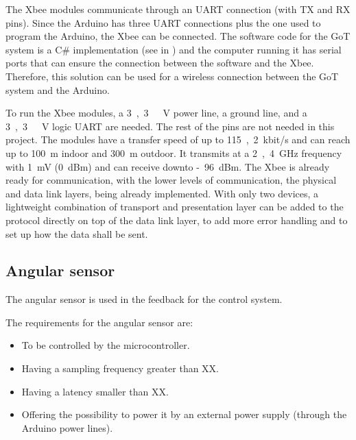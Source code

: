 
The Xbee modules communicate through an UART connection (with TX and RX pins). Since the Arduino has three UART connections plus the one used to program the Arduino, the Xbee can be connected. The software code for the GoT system is a C\# implementation (see in ) and the computer running it has serial ports that can ensure the connection between the software and the Xbee. Therefore, this solution can be used for a wireless connection between the GoT system and the Arduino.

To run the Xbee modules, a \si{3,3\ V} power line, a ground line, and a \si{3,3\ V} logic UART are needed. The rest of the pins are not needed in this project. The modules have a transfer speed of up to \si{115,2 kbit/s} and can reach up to \si{100 m} indoor and \si{300 m} outdoor. It transmits at a \si{2,4 GHz} frequency with \si{1 mV} (\si{0 dBm}) and can receive downto \si{-96 dBm}. The Xbee is already ready for communication, with the lower levels of communication, the physical and data link layers, being already implemented. With only two devices, a lightweight combination of transport and presentation layer can be added to the protocol directly on top of the data link layer, to add more error handling and to set up how the data shall be sent.



\subsection{Angular sensor}
The angular sensor is used in the feedback for the control system.

The requirements for the angular sensor are:
\begin{itemize}
\item To be controlled by the microcontroller.
\item Having a sampling frequency greater than XX. 
\item Having a latency smaller than XX. 
\item Offering the possibility to power it by an external power supply (through the Arduino power lines).
\end{itemize}

